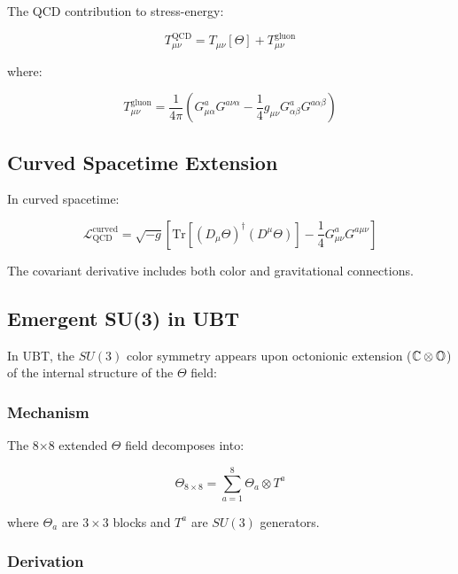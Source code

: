 The QCD contribution to stress-energy:

\begin{equation}
\label{eq:canonical:qcd_stress_energy}
T_{\mu\nu}^{\text{QCD}} = T_{\mu\nu}[\Theta] + T_{\mu\nu}^{\text{gluon}}
\end{equation}

where:

\begin{equation}
T_{\mu\nu}^{\text{gluon}} = \frac{1}{4\pi}\left(G^a_{\mu\alpha}G^{a\nu\alpha} - \frac{1}{4}g_{\mu\nu}G^a_{\alpha\beta}G^{a\alpha\beta}\right)
\end{equation}

\subsection{Curved Spacetime Extension}

In curved spacetime:

\begin{equation}
\label{eq:canonical:qcd_curved}
\mathcal{L}_{\text{QCD}}^{\text{curved}} = \sqrt{-g}\left[\text{Tr}\left[(D_\mu\Theta)^\dagger (D^\mu\Theta)\right] - \frac{1}{4} G^a_{\mu\nu} G^{a\mu\nu}\right]
\end{equation}

The covariant derivative includes both color and gravitational connections.

\subsection{Emergent SU(3) in UBT}
\label{sec:canonical:emergent_su3}

In UBT, the $SU(3)$ color symmetry appears upon octonionic extension ($\mathbb C \otimes \mathbb O$) of the internal structure of the $\Theta$ field:

\subsubsection{Mechanism}

The 8×8 extended $\Theta$ field decomposes into:

\begin{equation}
\Theta_{8 \times 8} = \sum_{a=1}^{8} \Theta_a \otimes T^a
\end{equation}

where $\Theta_a$ are $3 \times 3$ blocks and $T^a$ are $SU(3)$ generators.

\subsubsection{Derivation}

